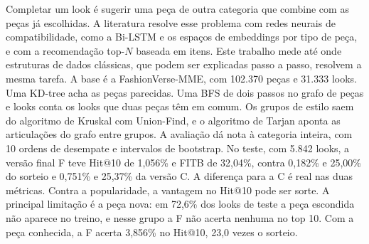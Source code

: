 Completar um look é sugerir uma peça de outra categoria que combine com as peças já escolhidas. A literatura resolve esse problema com redes neurais de compatibilidade, como a Bi-LSTM e os espaços de embeddings por tipo de peça, e com a recomendação top-$N$ baseada em itens. Este trabalho mede até onde estruturas de dados clássicas, que podem ser explicadas passo a passo, resolvem a mesma tarefa. A base é a FashionVerse-MME, com 102.370 peças e 31.333 looks. Uma KD-tree acha as peças parecidas. Uma BFS de dois passos no grafo de peças e looks conta os looks que duas peças têm em comum. Os grupos de estilo saem do algoritmo de Kruskal com Union-Find, e o algoritmo de Tarjan aponta as articulações do grafo entre grupos. A avaliação dá nota à categoria inteira, com 10 ordens de desempate e intervalos de bootstrap. No teste, com 5.842 looks, a versão final F teve Hit@10 de 1,056\% e FITB de 32,04\%, contra 0,182\% e 25,00\% do sorteio e 0,751\% e 25,37\% da versão C. A diferença para a C é real nas duas métricas. Contra a popularidade, a vantagem no Hit@10 pode ser sorte. A principal limitação é a peça nova: em 72,6\% dos looks de teste a peça escondida não aparece no treino, e nesse grupo a F não acerta nenhuma no top 10. Com a peça conhecida, a F acerta 3,856\% no Hit@10, 23,0 vezes o sorteio.

